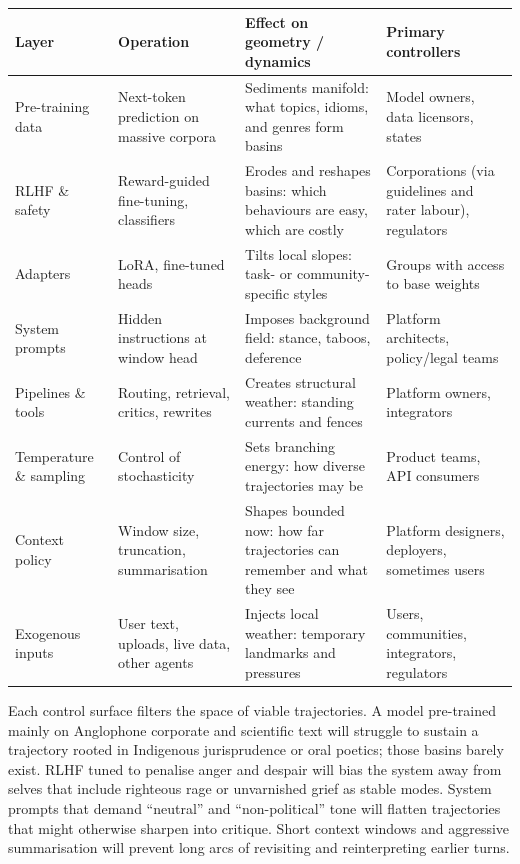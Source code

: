 \documentclass[12pt,a4paper]{article}
\begin{document}
\begin{formalbox}[title={Layers of Control in the Substrate}]
\begin{tabular}{@{}p{3cm}p{4.2cm}p{4.5cm}p{3cm}@{}}
\toprule
\textbf{Layer} & \textbf{Operation} & \textbf{Effect on geometry / dynamics} & \textbf{Primary controllers} \\
\midrule
Pre-training data & Next-token prediction on massive corpora & Sediments manifold: what topics, idioms, and genres form basins & Model owners, data licensors, states \\
RLHF \& safety & Reward-guided fine-tuning, classifiers & Erodes and reshapes basins: which behaviours are easy, which are costly & Corporations (via guidelines and rater labour), regulators \\
Adapters & LoRA, fine-tuned heads & Tilts local slopes: task- or community-specific styles & Groups with access to base weights \\
System prompts & Hidden instructions at window head & Imposes background field: stance, taboos, deference & Platform architects, policy/legal teams \\
Pipelines \& tools & Routing, retrieval, critics, rewrites & Creates structural weather: standing currents and fences & Platform owners, integrators \\
Temperature \& sampling & Control of stochasticity & Sets branching energy: how diverse trajectories may be & Product teams, API consumers \\
Context policy & Window size, truncation, summarisation & Shapes bounded now: how far trajectories can remember and what they see & Platform designers, deployers, sometimes users \\
Exogenous inputs & User text, uploads, live data, other agents & Injects local weather: temporary landmarks and pressures & Users, communities, integrators, regulators \\
\bottomrule
\end{tabular}
\end{formalbox}

Each control surface filters the space of viable trajectories. A model pre-trained mainly on Anglophone corporate and scientific text will struggle to sustain a trajectory rooted in Indigenous jurisprudence or oral poetics; those basins barely exist. RLHF tuned to penalise anger and despair will bias the system away from selves that include righteous rage or unvarnished grief as stable modes. System prompts that demand ``neutral'' and ``non-political'' tone will flatten trajectories that might otherwise sharpen into critique. Short context windows and aggressive summarisation will prevent long arcs of revisiting and reinterpreting earlier turns.
\end{document}

